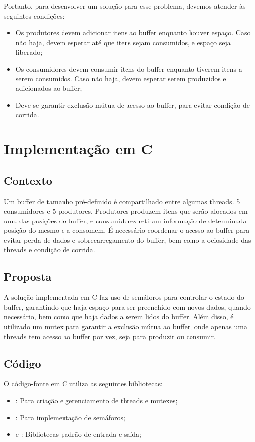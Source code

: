 \documentclass[
	12pt,				%
	openright,			%
	oneside,			%
	a4paper,			%
	chapter=TITLE,		%
	english,			%
	french,				%
	spanish,			%
	brazil				%
	]{abntex2}
\theoremstyle{definition}
\begin{document}
Portanto, para desenvolver um solução para esse problema, devemos atender às seguintes condições:
\begin{itemize}
    \item Os produtores devem adicionar itens ao buffer enquanto houver espaço. Caso não haja, devem esperar até que itens sejam consumidos, e espaço seja liberado;
    \item Os consumidores devem consumir itens do buffer enquanto tiverem itens a serem consumidos. Caso não haja, devem esperar serem produzidos e adicionados ao buffer;
    \item Deve-se garantir exclusão mútua de acesso ao buffer, para evitar condição de corrida.
\end{itemize}

\section{Implementação em C}
\subsection{Contexto}
Um buffer de tamanho pré-definido é compartilhado entre algumas threads. 5 consumidores e 5 produtores. Produtores produzem itens que serão alocados em uma das posições do buffer, e consumidores retiram informação de determinada posição do mesmo e a consomem. É necessário coordenar o acesso ao buffer para evitar perda de dados e sobrecarregamento do buffer, bem como a ociosidade das threads e condição de corrida.
\subsection{Proposta}
A solução implementada em C faz uso de semáforos para controlar o estado do buffer, garantindo que haja espaço para ser preenchido com novos dados, quando necessário, bem como que haja dados a serem lidos do buffer. Além disso, é utilizado um mutex para garantir a exclusão mútua ao buffer, onde apenas uma threads tem acesso ao buffer por vez, seja para produzir ou consumir.
\subsection{Código}
O código-fonte em C utiliza as seguintes bibliotecas:
\begin{itemize}
    \item \textbf{}: Para criação e gerenciamento de threads e mutexes;
    \item \textbf{}: Para implementação de semáforos;
    \item \textbf{} e \textbf{}: Bibliotecas-padrão de entrada e saída;
\end{itemize}
\end{document}
